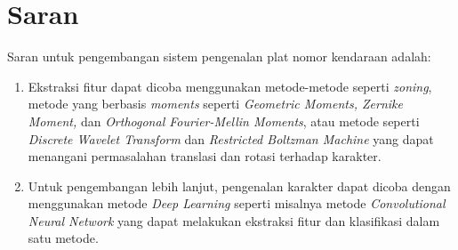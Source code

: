 \section{Saran}
\noindent Saran untuk pengembangan sistem pengenalan plat nomor kendaraan adalah:
\begin{enumerate}
\item Ekstraksi fitur dapat dicoba menggunakan metode-metode seperti \textit{zoning}, metode yang berbasis \textit{moments} seperti \textit{Geometric Moments, Zernike Moment,} dan \textit{Orthogonal Fourier-Mellin Moments}, atau metode seperti \textit{Discrete Wavelet Transform} dan \textit{Restricted Boltzman Machine} yang dapat menangani permasalahan translasi dan rotasi terhadap karakter.

\item Untuk pengembangan lebih lanjut, pengenalan karakter dapat dicoba dengan menggunakan metode \textit{Deep Learning} seperti misalnya metode \textit{Convolutional Neural Network} yang dapat melakukan ekstraksi fitur dan klasifikasi dalam satu metode.

\end{enumerate}

\newpage
